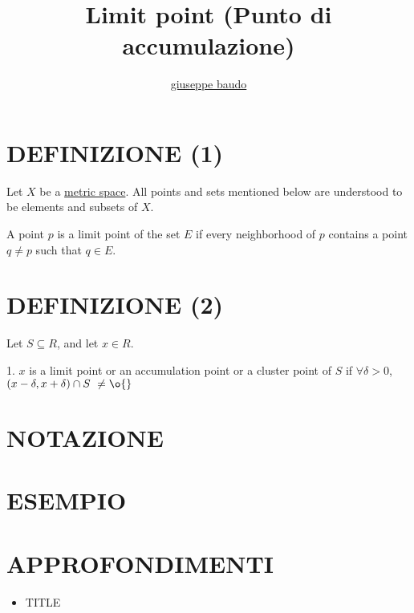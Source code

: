 \documentclass[a4paper,10pt]{article}
\title{Limit point (Punto di accumulazione)}
\author{\href{http://www.baudo.hol.es}{giuseppe baudo}}
\begin{document}
\maketitle

\section{DEFINIZIONE (1)}
Let $X$ be a \href{MetricSpace.html}{metric space}. All points and sets mentioned below are understood to be elements and subsets of $X$.

A point $p$ is a limit point of the set $E$ if every neighborhood of $p$ contains a point $q \ne p$ such that $q \in E$.

\section{DEFINIZIONE (2)}
Let $S \subseteq R$, and let $x \in R$.

1. $x$ is a limit point or an accumulation point or a cluster point of $S$ if $\forall \delta > 0$, $(x-\delta,x+\delta) \cap S \ \ne \o{}$

\section{NOTAZIONE}

\section{ESEMPIO}

\section{APPROFONDIMENTI}
\begin{itemize}
 \item TITLE
\end{itemize}
\end{document}
